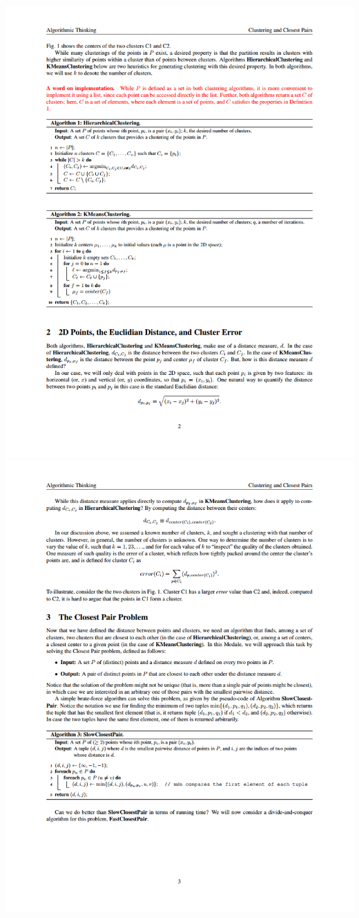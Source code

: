 \documentclass[11pt]{article}
\makeatletter
\def\maxwidth{\ifdim\Gin@nat@width>\linewidth\linewidth
    \else\Gin@nat@width\fi}
\let\Oldincludegraphics\includegraphics
\renewcommand{\includegraphics}[1]{\Oldincludegraphics[width=.8\maxwidth]{#1}}
\makeatother
\begin{document}
\includegraphics{img/cluster_2.png} \includegraphics{img/cluster_3.png}
\end{document}
